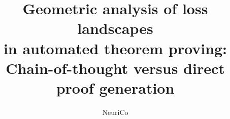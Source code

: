 \documentclass{amsart}
\title[Loss landscape geometry in theorem proving]{Geometric analysis of loss landscapes\\in automated theorem proving:\\Chain-of-thought versus direct proof generation}
\author{NeuriCo}
\theoremstyle{definition}
\theoremstyle{remark}
\numberwithin{equation}{section}
\begin{document}
\begin{abstract}

\end{abstract}

\maketitle









\end{document}
